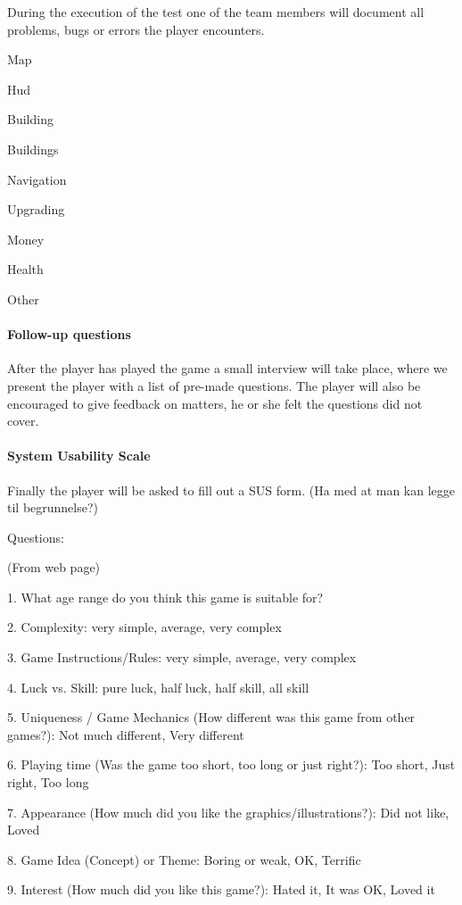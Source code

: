 During the execution of the test one of the team members will document all problems, bugs or errors the player encounters.


Map

Hud

Building

Buildings

Navigation

Upgrading

Money

Health

Other


\paragraph{Follow-up questions}

After the player has played the game a small interview will take place, where we present the player with a list of pre-made questions. The player will also be encouraged to give feedback on matters, he or she felt the questions did not cover.

\paragraph{System Usability Scale}

Finally the player will be asked to fill out a SUS form. (Ha med at man kan legge til begrunnelse?)

Questions:

(From web page)

1. What age range do you think this game is suitable for?

2. Complexity: very simple, average, very complex

3. Game Instructions/Rules: very simple, average, very complex

4. Luck vs. Skill: pure luck, half luck, half skill, all skill

5. Uniqueness / Game Mechanics (How different was this game from other games?): Not much different, Very different

6. Playing time (Was the game too short, too long or just right?): Too short, Just right, Too long

7. Appearance (How much did you like the graphics/illustrations?): Did not like, Loved

8. Game Idea (Concept) or Theme: Boring or weak, OK, Terrific

9. Interest (How much did you like this game?): Hated it, It was OK, Loved it

